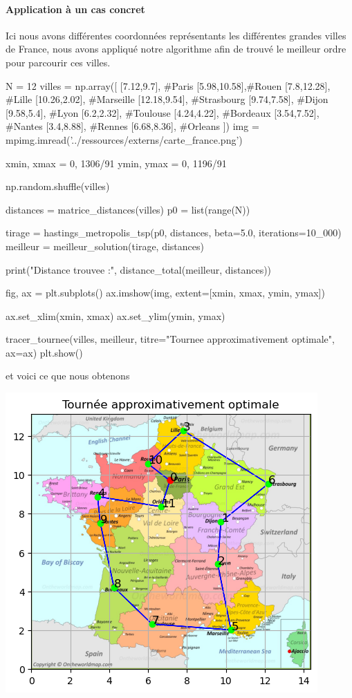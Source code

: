 \documentclass{article}
\begin{document}
\newpage
\paragraph{Application à un cas concret}

Ici nous avons différentes coordonnées représentants les différentes grandes villes de France, nous avons appliqué notre algorithme afin de trouvé le meilleur ordre pour parcourir ces villes.

\begin{center}
\begin{python}
N = 12
villes = np.array([
    [7.12,9.7],  #Paris
    [5.98,10.58],#Rouen
    [7.8,12.28], #Lille
    [10.26,2.02], #Marseille
    [12.18,9.54], #Strasbourg
    [9.74,7.58], #Dijon
    [9.58,5.4], #Lyon
    [6.2,2.32], #Toulouse
    [4.24,4.22], #Bordeaux
    [3.54,7.52], #Nantes
    [3.4,8.88],  #Rennes
    [6.68,8.36], #Orleans
])
img = mpimg.imread('../ressources/externs/carte_france.png') 

xmin, xmax = 0, 1306/91
ymin, ymax = 0, 1196/91

np.random.shuffle(villes)

distances = matrice_distances(villes)
p0 = list(range(N))

tirage = hastings_metropolis_tsp(p0, distances, beta=5.0, iterations=10_000)
meilleur = meilleur_solution(tirage, distances)

print("Distance trouvee :", distance_total(meilleur, distances))

fig, ax = plt.subplots()
ax.imshow(img, extent=[xmin, xmax, ymin, ymax])  

ax.set_xlim(xmin, xmax)
ax.set_ylim(ymin, ymax)

tracer_tournee(villes, meilleur, titre="Tournee approximativement optimale", ax=ax)
plt.show()
\end{python}
\end{center}

et voici ce que nous obtenons

\includegraphics{france_tsp.png}
\end{document}
